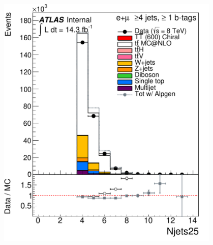 \begin{frame}
\begin{minipage}{.5\textwidth}
{\includegraphics[width=0.8\textwidth]{pics/Njets25_ELEMUON_4jetin1btagin_NOMINAL}

}

\end{minipage}

\end{frame}

